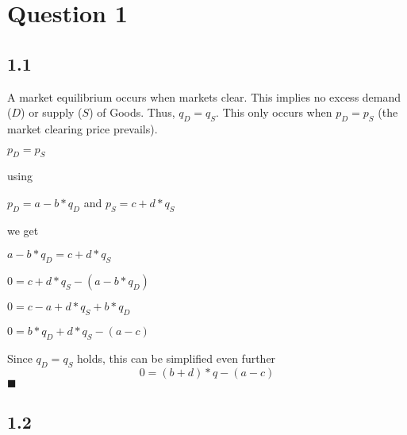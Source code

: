 \documentclass{article}
\begin{document}
\section{Question 1}

\subsection{1.1}
A market equilibrium occurs when markets clear. This implies no excess demand ($D$) or supply ($S$) of Goods. Thus, $q_D = q_S$. This only occurs when $p_D = p_S$ (the market clearing price prevails).
\begin{center} $p_D = p_S$ \end{center}
using
\begin{center} $p_D=a-b*q_D $ and $p_S=c+d*q_S$\end{center}
 we get
\begin{center} $a-b*q_D =c+d*q_S$ \end{center}
\begin{center} $0 =c+d*q_S-(a-b*q_D)$ \end{center}
\begin{center} $0 =c-a+d*q_S+b*q_D$ \end{center}
\begin{center} $0 =b*q_D+d*q_S-(a-c)$ \end{center}
Since $q_D = q_S$ holds, this can be simplified even further 
 \begin{equation} \label{First_One}0 =(b+d)*q-(a-c)\end{equation} $\blacksquare$
 
\subsection{1.2}
\end{document}
